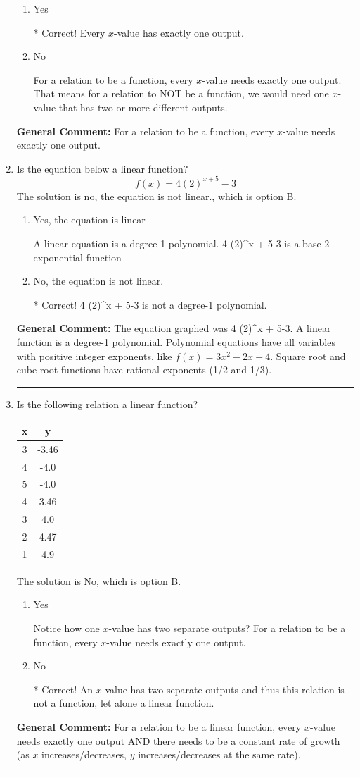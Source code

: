 \documentclass{extbook}[14pt]
\newcommand{\litem}[1]{\item #1

\rule{\textwidth}{0.4pt}}
\begin{document}
\begin{enumerate}
{\begin{enumerate}[label=\Alph*.]
\item Yes

* Correct! Every $x$-value has exactly one output.
\item No

For a relation to be a function, every $x$-value needs exactly one output. That means for a relation to NOT be a function, we would need one $x$-value that has two or more different outputs.
\end{enumerate}


\textbf{General Comment:} For a relation to be a function, every $x$-value needs exactly one output.
}
\litem{
Is the equation below a linear function?
\[ f(x) = 4 (2)^{x + 5}-3 \]The solution is no, the equation is not linear., which is option B.

\begin{enumerate}[label=\Alph*.]
\item Yes, the equation is linear

A linear equation is a degree-1 polynomial. 4 (2)^{x + 5}-3 is a base-2 exponential function
\item No, the equation is not linear.

* Correct! 4 (2)^{x + 5}-3 is not a degree-1 polynomial.
\end{enumerate}


\textbf{General Comment:} The equation graphed was 4 (2)^{x + 5}-3. A linear function is a degree-1 polynomial. Polynomial equations have all variables with positive integer exponents, like $f(x) = 3x^2-2x+4$. Square root and cube root functions have rational exponents (1/2 and 1/3).
}
\litem{
Is the following relation a linear function?


\begin{tabular}{c|c}
x &y\tabularnewline \hline
3 &-3.46\tabularnewline \hline
4 &-4.0\tabularnewline \hline
5 &-4.0\tabularnewline \hline
4 &3.46\tabularnewline \hline
3 &4.0\tabularnewline \hline
2 &4.47\tabularnewline \hline
1 &4.9\end{tabular}The solution is No, which is option B.

\begin{enumerate}[label=\Alph*.]
\item Yes

Notice how one $x$-value has two separate outputs? For a relation to be a function, every $x$-value needs exactly one output.
\item No

* Correct! An $x$-value has two separate outputs and thus this relation is not a function, let alone a linear function.
\end{enumerate}


\textbf{General Comment:} For a relation to be a linear function, every $x$-value needs exactly one output AND there needs to be a constant rate of growth (as $x$ increases/decreases, $y$ increases/decreases at the same rate).
}
\end{enumerate}
\end{document}
